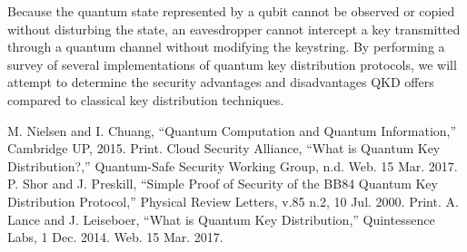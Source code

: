 \documentclass[conference]{IEEEtran}
\begin{document}
Because the quantum state represented by a qubit cannot be observed or copied without disturbing the state, an eavesdropper cannot intercept a key transmitted through a quantum channel without modifying the keystring. By performing a survey of several implementations of quantum key distribution protocols, we will attempt to determine the security advantages and disadvantages QKD offers compared to classical key distribution techniques.\\



%
%
%

\begin{thebibliography}{4}
  M. Nielsen and I. Chuang, ``Quantum Computation and Quantum Information,'' Cambridge UP, 2015. Print.
  Cloud Security Alliance, ``What is Quantum Key Distribution?,'' Quantum-Safe Security Working Group, n.d. Web. 15 Mar. 2017.
  P. Shor and J. Preskill, ``Simple Proof of Security of the BB84 Quantum Key Distribution Protocol,'' Physical Review Letters, v.85 n.2, 10 Jul. 2000. Print.
A. Lance and J. Leiseboer, ``What is Quantum Key Distribution,'' Quintessence Labs, 1 Dec. 2014. Web. 15 Mar. 2017.
\end{thebibliography}




\end{document}
